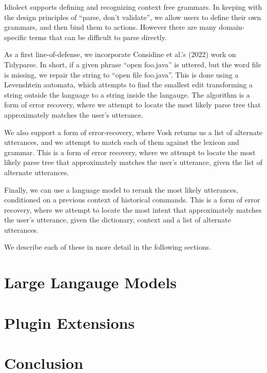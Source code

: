 \documentclass[conference]{IEEEtran}
\begin{document}
Idiolect supports defining and recognizing context free grammars. In keeping with the design principles of ``parse, don't validate'', we allow users to define their own grammars, and then bind them to actions. However there are many domain-specific terms that can be difficult to parse directly.

As a first line-of-defense, we incorporate Considine et al.'s (2022) work on Tidyparse. In short, if a given phrase ``open foo.java'' is uttered, but the word file is missing, we repair the string to ``open file foo.java''. This is done using a Levenshtein automata, which attempts to find the smallest edit transforming a string outside the language to a string inside the langauge. The algorithm is a form of error recovery, where we attempt to locate the most likely parse tree that approximately matches the user's utterance.

We also support a form of error-recovery, where Vosk returns us a list of alternate utterances, and we attempt to match each of them against the lexicon and grammar. This is a form of error recovery, where we attempt to locate the most likely parse tree that approximately matches the user's utterance, given the list of alternate utterances.

Finally, we can use a language model to rerank the most likely utterances, conditioned on a previous context of historical commands. This is a form of error recovery, where we attempt to locate the most intent that approximately matches the user's utterance, given the dictionary, context and a list of alternate utterances.

We describe each of these in more detail in the following sections.

\section{Large Langauge Models}

\section{Plugin Extensions}

\section{Conclusion}
\end{document}

